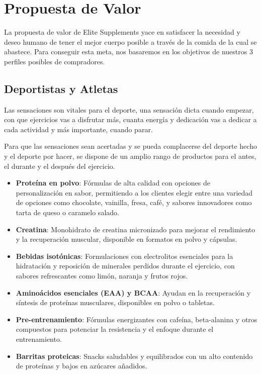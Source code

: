 \documentclass[11pt,a4paper]{report}
\begin{document}

\newpage

\section{Propuesta de Valor}
La propuesta de valor de Elite Supplements yace en satisfacer la necesidad y deseo humano de tener el mejor cuerpo posible a través de la comida de la cual se abastece. Para conseguir esta meta, nos basaremos en los objetivos de nuestros 3 perfiles posibles de compradores.

\subsection{Deportistas y Atletas}
Las sensaciones son vitales para el deporte, una sensación dicta cuando empezar, con que ejercicios vas a disfrutar más, cuanta energía y dedicación vas a dedicar a cada actividad y más importante, cuando parar.

Para que las sensaciones sean acertadas y se pueda complacerse del deporte hecho y el deporte por hacer, se dispone de un amplio rango de productos para el antes, el durante y el después del ejercicio.

\begin{itemize}
    \item \textbf{Proteína en polvo}: Fórmulas de alta calidad con opciones de personalización en sabor, permitiendo a los clientes elegir entre una variedad de opciones como chocolate, vainilla, fresa, café, y sabores innovadores como tarta de queso o caramelo salado.
    \item \textbf{Creatina}: Monohidrato de creatina micronizado para mejorar el rendimiento y la recuperación muscular, disponible en formatos en polvo y cápsulas.
    \item \textbf{Bebidas isotónicas}: Formulaciones con electrolitos esenciales para la hidratación y reposición de minerales perdidos durante el ejercicio, con sabores refrescantes como limón, naranja y frutos rojos.
    \item \textbf{Aminoácidos esenciales (EAA) y BCAA}: Ayudan en la recuperación y síntesis de proteínas musculares, disponibles en polvo o tabletas.
    \item \textbf{Pre-entrenamiento}: Fórmulas energizantes con cafeína, beta-alanina y otros compuestos para potenciar la resistencia y el enfoque durante el entrenamiento.
    \item \textbf{Barritas proteicas}: Snacks saludables y equilibrados con un alto contenido de proteínas y bajos en azúcares añadidos.
\end{itemize}
\end{document}
